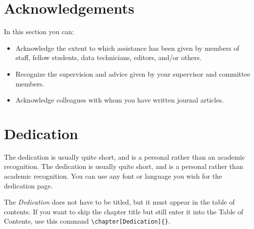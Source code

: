 \newpage
{} \label{tableofcontent}%
\tableofcontents                %
\newpage 
{} \label{listoftab}%
\listoftables                   %
\newpage
{} \label{listoffig}%
\listoffigures                  %


\chapter{Acknowledgements}      %
In this section you can:
\begin{itemize}
    \item Acknowledge the extent to which assistance has been given by members of staff, fellow students, data technicians, editors, and/or others.
    \item Recognize the supervision and advice given by your supervisor and committee members.
    \item Acknowledge colleagues with whom you have written journal articles.
\end{itemize}

\chapter{Dedication} %
The dedication is usually quite short, and is a personal rather than
an academic recognition. The dedication is usually quite short, and is a personal rather than academic recognition. You can use any font or language you wish for the dedication page.

The \emph{Dedication} does not have to be
titled, but it must appear in the table of contents.  If you want to
skip the chapter title but still enter it into the Table of Contents,
use this command \verb|\chapter[Dedication]{}|.




\mainmatter
